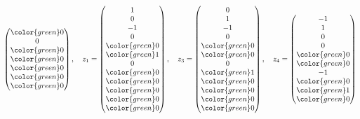 \begin{loesung}
\[\begin{pmatrix}
\color{green} 0\\
              0\\
\color{green} 0\\
\color{green} 0\\
\color{green} 0\\
\color{green} 0\\
\color{green} 0
\end{pmatrix}
,\quad
z_1=\begin{pmatrix}
              1\\
              0\\
             -1\\
              0\\
\color{green} 0\\
\color{green} 1\\
              0\\
\color{green} 0\\
\color{green} 0\\
\color{green} 0\\
\color{green} 0\\
\color{green} 0
\end{pmatrix}
,\quad
z_3=\begin{pmatrix}
              0\\
              1\\
             -1\\
              0\\
\color{green} 0\\
\color{green} 0\\
              0\\
\color{green} 1\\
\color{green} 0\\
\color{green} 0\\
\color{green} 0\\
\color{green} 0
\end{pmatrix}
,\quad
z_4=\begin{pmatrix}
             -1\\
              1\\
              0\\
              0\\
\color{green} 0\\
\color{green} 0\\
             -1\\
\color{green} 0\\
\color{green} 1\\
\color{green} 0\\

\end{pmatrix}\]
\end{loesung}
